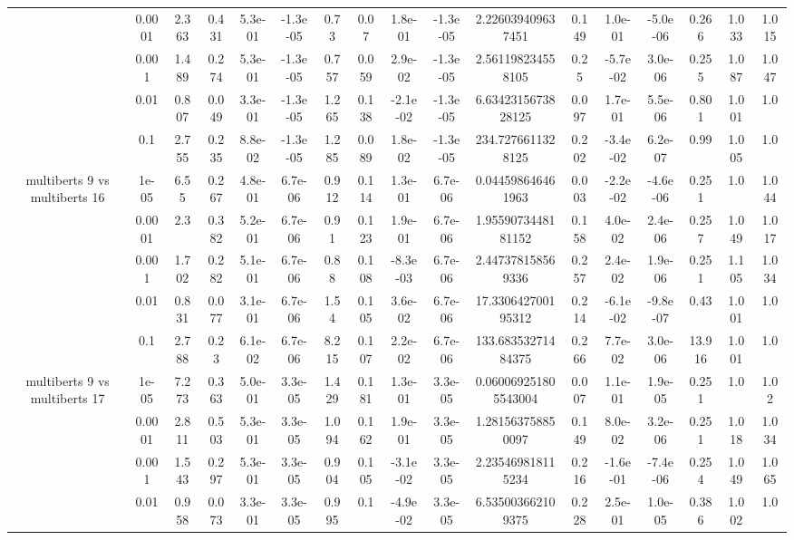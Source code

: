\begin{tabular}{|c|c|c|c|c|c|c|c|c|c|c|c|c|c|c|c|c|}
 & 0.0001 & 2.363 & 0.431 & 5.3e-01 & -1.3e-05 & 0.73 & 0.07 & 1.8e-01 & -1.3e-05 & 2.226039409637451 & 0.149 & 1.0e-01 & -5.0e-06 & 0.266 & 1.033 & 1.015 \\
 & 0.001 & 1.489 & 0.274 & 5.3e-01 & -1.3e-05 & 0.757 & 0.059 & 2.9e-02 & -1.3e-05 & 2.561198234558105 & 0.25 & -5.7e-02 & 3.0e-06 & 0.255 & 1.087 & 1.047 \\
 & 0.01 & 0.807 & 0.049 & 3.3e-01 & -1.3e-05 & 1.265 & 0.138 & -2.1e-02 & -1.3e-05 & 6.6342315673828125 & 0.097 & 1.7e-01 & 5.5e-06 & 0.801 & 1.001 & 1.0 \\
 & 0.1 & 2.755 & 0.235 & 8.8e-02 & -1.3e-05 & 1.285 & 0.089 & 1.8e-02 & -1.3e-05 & 234.7276611328125 & 0.202 & -3.4e-02 & 6.2e-07 & 0.99 & 1.005 & 1.0 \\
\hline
\multirow{5}{*}{multiberts 9 vs multiberts 16} & 1e-05 & 6.55 & 0.267 & 4.8e-01 & 6.7e-06 & 0.912 & 0.114 & 1.3e-01 & 6.7e-06 & 0.044598646461963 & 0.003 & -2.2e-02 & -4.6e-06 & 0.251 & 1.0 & 1.044 \\
 & 0.0001 & 2.3 & 0.382 & 5.2e-01 & 6.7e-06 & 0.91 & 0.123 & 1.9e-01 & 6.7e-06 & 1.9559073448181152 & 0.158 & 4.0e-02 & 2.4e-06 & 0.257 & 1.049 & 1.017 \\
 & 0.001 & 1.702 & 0.282 & 5.1e-01 & 6.7e-06 & 0.88 & 0.108 & -8.3e-03 & 6.7e-06 & 2.447378158569336 & 0.257 & 2.4e-02 & 1.9e-06 & 0.251 & 1.105 & 1.034 \\
 & 0.01 & 0.831 & 0.077 & 3.1e-01 & 6.7e-06 & 1.54 & 0.105 & 3.6e-02 & 6.7e-06 & 17.330642700195312 & 0.214 & -6.1e-02 & -9.8e-07 & 0.43 & 1.001 & 1.0 \\
 & 0.1 & 2.788 & 0.23 & 6.1e-02 & 6.7e-06 & 8.215 & 0.107 & 2.2e-02 & 6.7e-06 & 133.68353271484375 & 0.266 & 7.7e-02 & 3.0e-06 & 13.916 & 1.001 & 1.0 \\
\hline
\multirow{5}{*}{multiberts 9 vs multiberts 17} & 1e-05 & 7.273 & 0.363 & 5.0e-01 & 3.3e-05 & 1.429 & 0.181 & 1.3e-01 & 3.3e-05 & 0.060069251805543004 & 0.007 & 1.1e-01 & 1.9e-05 & 0.251 & 1.0 & 1.02 \\
 & 0.0001 & 2.811 & 0.503 & 5.3e-01 & 3.3e-05 & 1.094 & 0.162 & 1.9e-01 & 3.3e-05 & 1.281563758850097 & 0.149 & 8.0e-02 & 3.2e-06 & 0.251 & 1.018 & 1.034 \\
 & 0.001 & 1.543 & 0.297 & 5.3e-01 & 3.3e-05 & 0.904 & 0.105 & -3.1e-02 & 3.3e-05 & 2.235469818115234 & 0.216 & -1.6e-01 & -7.4e-06 & 0.254 & 1.049 & 1.065 \\
 & 0.01 & 0.958 & 0.073 & 3.3e-01 & 3.3e-05 & 0.995 & 0.1 & -4.9e-02 & 3.3e-05 & 6.535003662109375 & 0.228 & 2.5e-01 & 1.0e-05 & 0.386 & 1.002 & 1.0 \\

\end{tabular}
